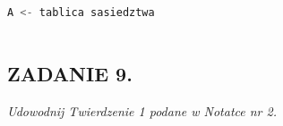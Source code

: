 \documentclass{article}
\begin{document}
\begin{lstlisting}[language=Python]
A <- tablica sasiedztwa



\end{lstlisting}








    


        




\subsection*{ZADANIE 9.}
\emph{Udowodnij Twierdzenie 1 podane w Notatce nr 2.}
\smallskip
\end{document}
